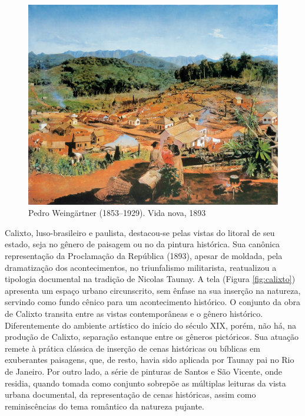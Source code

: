 \begin{figure}
\hypertarget{fig:weingaertner}{%
\centering
\includegraphics{figures/Pedro_Weingaertner_-_Vida_nova_-_1893.jpeg}
\caption{Pedro Weingärtner (1853--1929). Vida nova,
1893}\label{fig:weingaertner}
}
\end{figure}

Calixto, luso-brasileiro e paulista, destacou-se pelas vistas do litoral
de seu estado, seja no gênero de paisagem ou no da pintura histórica.
Sua canônica representação da Proclamação da República (1893), apesar de
moldada, pela dramatização dos acontecimentos, no triunfalismo
militarista, reatualizou a tipologia documental na tradição de Nicolas
Taunay. A tela (Figura \ref{fig:calixto}) apresenta um espaço urbano
circunscrito, sem ênfase na sua inserção na natureza, servindo como
fundo cênico para um acontecimento histórico. O conjunto da obra de
Calixto transita entre as vistas contemporâneas e o gênero histórico.
Diferentemente do ambiente artístico do início do século XIX, porém, não
há, na produção de Calixto, separação estanque entre os gêneros
pictóricos. Sua atuação remete à prática clássica de inserção de cenas
históricas ou bíblicas em exuberantes paisagens, que, de resto, havia
sido aplicada por Taunay pai no Rio de Janeiro. Por outro lado, a série
de pinturas de Santos e São Vicente, onde residia, quando tomada como
conjunto sobrepõe as múltiplas leituras da vista urbana documental, da
representação de cenas históricas, assim como reminiscências do tema
romântico da natureza pujante.

